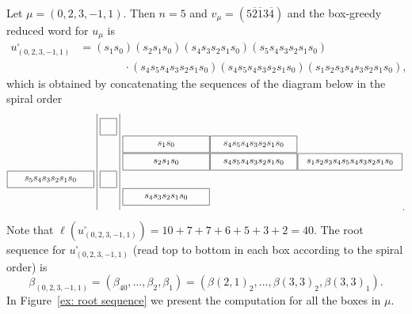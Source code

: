 \documentclass[11pt]{article}
\theoremstyle{plain}
\theoremstyle{definition}
\newenvironment{example}
  {\pushQED{\qed}\exampleinner}
  {\popQED\endexampleinner}
\theoremstyle{remark}
\numberwithin{equation}{section}
\newcounter{r}
\newcounter{s}
\begin{document}
\begin{example} \label{ex023m11}
Let $\mu = (0,2,3,-1,1)$. Then $n=5$ and $v_\mu = (5\overline{2}\overline{1}3\overline{4})$ and the box-greedy reduced word for $u_\mu$ is
\begin{align*}
u_{(0,2,3,-1,1)}^\square 
&= (s_1s_0)(s_2s_1s_0)(s_4s_3s_2s_1s_0)(s_5s_4s_3s_2s_1s_0) 
\\ &\qquad\qquad\cdot 
(s_4s_5s_4s_3s_2s_1s_0)(s_4s_5s_4s_3s_2s_1s_0)(s_1s_2s_3s_4s_3s_2s_1s_0),
\end{align*}
which is obtained by concatenating the sequences of the diagram below in the spiral order
\[
\begin{matrix}\begin{tikzpicture}[scale = 0.65]
\foreach \x\y in {1/0, 4/0}{
    \draw[thin] (\y+0.025, -\x-0.025) rectangle (0.975+\y, -\x-.975);
    \draw (0.5+\y,-\x-0.5) node (\x\y) {};
}
\foreach \x\y in {4/-1}{
    \draw[thin] (5*\y+0.025-0.3, -\x-0.025) rectangle (4.975+5*\y-0.3, -\x-.975);
    \draw (2.5+5*\y-0.3,-\x-0.5) node (\x\y) {};
}
\foreach \x\y in {2/1, 2/2, 3/1, 3/2, 5/1}{
    \draw[thin] (5*\y+0.025 + 0.3 - 4, -\x-0.025) rectangle (4.975+5*\y + 0.3 - 4, -\x-.975);
    \draw (2.5+5*\y + 0.3 - 4,-\x-0.5) node (\x\y) {};
}
\foreach \x\y in {3/3}{
    \draw[thin] (5*\y+0.025 + 0.3 - 4, -\x-0.025) rectangle (4.975+5*\y + 0.3 - 3, -\x-.975);
    \draw (2.5+5*\y + 0.3 - 3.5,-\x-0.5) node (\x\y) {};
}
\node at (21) {$ s_{1}s_{0}$};
\node at (22) {$ s_{4}s_{5}s_{4}s_{3}s_{2}s_{1}s_{0}$};
\node at (31) {$ s_{2}s_{1}s_{0}$};
\node at (32) {$ s_{4}s_{5}s_{4}s_{3}s_{2}s_{1}s_{0}$};
\node at (33) {$ s_{1}s_{2}s_{3}s_{4}s_{5}s_{4}s_{3}s_{2}s_{1}s_{0}$};
\node at (4-1) {$ s_{5}s_{4}s_{3}s_{2}s_{1}s_{0}$};
\node at (51) {$ s_{4}s_{3}s_{2}s_{1}s_{0}$};
\draw (-0.15, -0.75) -- (-0.15, -6.25);
\draw (1.15, -0.75) -- (1.15, -6.25);
\end{tikzpicture}
.
\end{matrix}
\]
Note that $\ell(u^\square_{(0,2,3,-1,1)}) = 10+7+7+6+5+3+2=40$.
The root sequence for $u_{(0,2,3,-1,1)}^\square$ (read top to bottom in each box according to the spiral order) is
$$\beta_{(0,2,3,-1,1)} = (\beta_{40}, \ldots, \beta_2, \beta_1) = (\beta(2,1)_2, \ldots, \beta(3,3)_2, \beta(3,3)_1).$$
In Figure~\ref{ex: root sequence} we present the computation for all the boxes in $\mu$.


\end{example}
\end{document}
